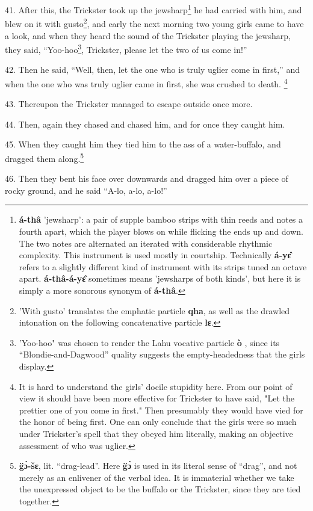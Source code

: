 41. After this, the Trickster took up the jewsharp\footnote{\textbf{á-thâ} 'jewsharp': a pair of supple bamboo strips with thin reeds and notes a fourth apart, which the player blows on while flicking the ends up and down. The two notes are alternated an iterated with considerable rhythmic complexity. This instrument is used mostly in courtship. Technically \textbf{á-yɛ̂} refers to a slightly different kind of instrument with its strips tuned an octave apart. \textbf{á-thâ-á-yɛ̂} sometimes means 'jewsharps of both kinds', but here it is simply a more sonorous synonym of \textbf{á-thâ}.} he had carried with him,
and blew on it with gusto\footnote{'With gusto' translates the emphatic particle \textbf{qha}, as well as the drawled intonation on the following concatenative particle \textbf{lɛ}.}, and early the next morning two young girls came
to have a look, and when they heard the sound of the Trickster playing the jewsharp,
they said, ``Yoo-hoo\footnote{'Yoo-hoo" was chosen to render the Lahu vocative particle \textbf{ò} , since its ``Blondie-and-Dagwood'' quality suggests the empty-headedness that the girls display.}, Trickster, please let the two of us come in!''

42. Then he said, ``Well, then, let the one who is truly uglier come in first,''
and when the one who was truly uglier came in first, she was crushed to death.
\footnote{It is hard to understand the girls' docile stupidity here. From our point of view it should have been more effective for Trickster to have said, "Let the prettier one of you come in first." Then presumably they would have vied for the honor of being first. One can only conclude that the girls were so much under Trickster's spell that they obeyed him literally, making an objective assessment of who was uglier.}

43. Thereupon the Trickster managed to escape outside once more.

44. Then, again they chased and chased him, and for once they caught him.

45. When they caught him they tied him to the ass of a water-buffalo, and dragged
them along.\footnote{\textbf{g̈ɔ̀-šɛ}, lit. ``drag-lead''. Here \textbf{g̈ɔ̀} is used in its literal sense of ``drag'', and not merely as an enlivener of the verbal idea. It is immaterial whether we take the unexpressed object to be the buffalo or the Trickster, since they are tied together.}

46. Then they bent his face over downwards and dragged him over a piece of rocky
ground, and he said ``A-lo, a-lo, a-lo!''

